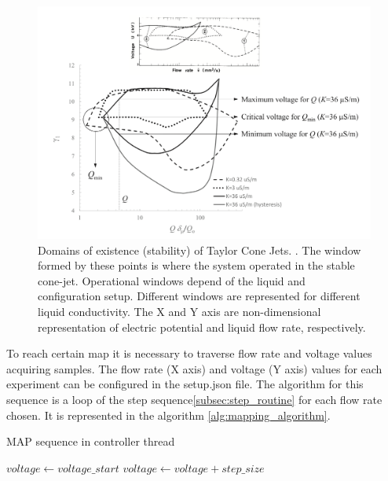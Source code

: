 \begin{figure}[H]
    \center
    \includegraphics[width=13cm]{Figuras/ganan_calvo_map.png}
    \caption{Domains of existence (stability) of Taylor Cone Jets. \cite{gananCalvo} . The window formed by these points is where the system operated in the stable cone-jet. Operational windows depend of the liquid and configuration setup. Different windows are represented for different liquid conductivity. The X and Y axis are non-dimensional representation of electric potential and liquid flow rate, respectively.}
    \label{fig:ganan_calvo_fig}
\end{figure}

To reach certain map it is necessary to traverse flow rate and voltage values acquiring samples.
The flow rate (X axis) and voltage (Y axis) values for each experiment can be configured in the setup.json file.
The algorithm for this sequence is a loop of the step sequence\ref{subsec:step_routine} for each flow rate chosen. It is represented in the algorithm \ref{alg:mapping_algorithm}.


    \begin{algorithm}
        \caption{MAP sequence in controller thread}\label{alg:mapping_algorithm}
        \begin{algorithmic}
              
                \State {}
                \State $voltage \gets voltage\_start$
                 
                    \State {}
                    \State {}
                    \State $voltage \gets voltage + step\_size$
                \EndWhile
            \EndFor
        \EndProcedure

        \end{algorithmic}
    \end{algorithm}

